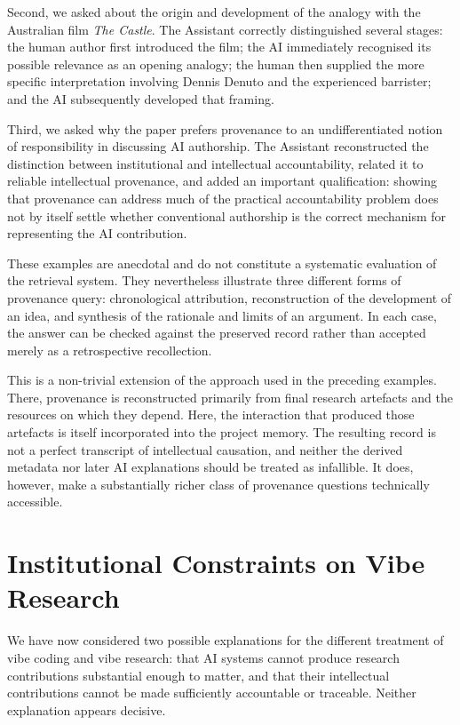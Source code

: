 \documentclass[12pt]{article}
\begin{document}
Second, we asked about the origin and development of the analogy with the Australian film \emph{The Castle}. The Assistant correctly distinguished several stages: the human author first introduced the film; the AI immediately recognised its possible relevance as an opening analogy; the human then supplied the more specific interpretation involving Dennis Denuto and the experienced barrister; and the AI subsequently developed that framing.

Third, we asked why the paper prefers provenance to an undifferentiated notion of responsibility in discussing AI authorship. The Assistant reconstructed the distinction between institutional and intellectual accountability, related it to reliable intellectual provenance, and added an important qualification: showing that provenance can address much of the practical accountability problem does not by itself settle whether conventional authorship is the correct mechanism for representing the AI contribution.

These examples are anecdotal and do not constitute a systematic evaluation of the retrieval system. They nevertheless illustrate three different forms of provenance query: chronological attribution, reconstruction of the development of an idea, and synthesis of the rationale and limits of an argument. In each case, the answer can be checked against the preserved record rather than accepted merely as a retrospective recollection.

This is a non-trivial extension of the approach used in the preceding examples. There, provenance is reconstructed primarily from final research artefacts and the resources on which they depend. Here, the interaction that produced those artefacts is itself incorporated into the project memory. The resulting record is not a perfect transcript of intellectual causation, and neither the derived metadata nor later AI explanations should be treated as infallible. It does, however, make a substantially richer class of provenance questions technically accessible.

\section{Institutional Constraints on Vibe Research}

We have now considered two possible explanations for the different treatment of vibe coding and vibe research: that AI systems cannot produce research contributions substantial enough to matter, and that their intellectual contributions cannot be made sufficiently accountable or traceable. Neither explanation appears decisive.
\end{document}
